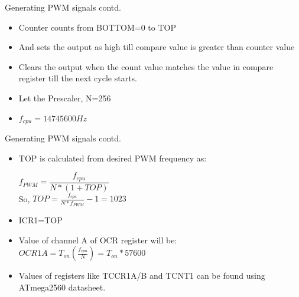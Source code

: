 \documentclass[table,10pt,red]{beamer}	%
\begin{document}
\begin{frame}{Generating PWM signals contd.}
	\begin{itemize}
		\item
		Counter counts from BOTTOM=0 to TOP
		\pause
		\item
		And sets the output as high till compare value is greater than counter value
		\pause
		\item
		Clears the output when the count value matches the value in compare register till the next cycle starts.
		\pause
		\item
		Let the Prescaler, N=256
		

		\pause
		\item
	$	f_{cpu} = 14745600 Hz $

	\end{itemize}
\end{frame}
		
\begin{frame}{Generating PWM signals contd.}
	\begin{itemize}		
		
		\item
		TOP is calculated from desired PWM frequency as:
		\pause
		
		$	f_{PWM} = \dfrac{f_{cpu}}{N*(1+TOP)} $ \\
		So,	
		$	TOP = \frac{f_{cpu}}{N*f_{PWM}} - 1 = 1023 $
		
		
		\pause
		\item
		ICR1=TOP
		\item
		Value of channel A of OCR register will be:\\
		\pause
		$	OCR1A = T_{on}(\frac{f_{cpu}}{N}) = T_{on} * 57600    $ \\
		\pause
		\item
		Values of registers like TCCR1A/B and TCNT1 can be found using ATmega2560 datasheet.

		
	\end{itemize}
\end{frame}
\end{document}
